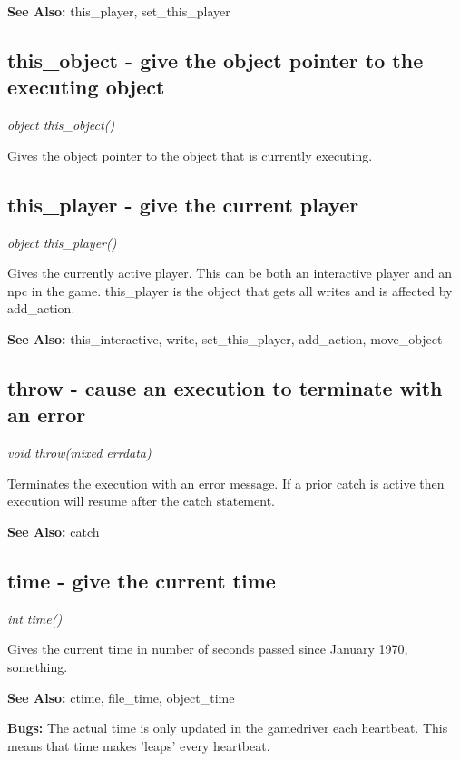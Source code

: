     {\bf See Also: }    this\_player, set\_this\_player



\subsection{this\_object - give the object pointer to the executing object}

    {\em object this\_object()}

    Gives the object pointer to the object that is currently executing.


\subsection{this\_player - give the current player}

    {\em object this\_player()}

    Gives the currently active player. This can be both an interactive
    player and an npc in the game. this\_player is the object that gets
    all writes and is affected by add\_action.

    {\bf See Also: }    this\_interactive, write, set\_this\_player, add\_action, move\_object



\subsection{throw - cause an execution to terminate with an error}

    {\em void throw(mixed errdata)}

    Terminates the execution with an error message. If a prior catch is
    active then execution will resume after the catch statement.

    {\bf See Also: }    catch



\subsection{time - give the current time}

    {\em int time()}

    Gives the current time in number of seconds passed since January 1970,
    something. 

    {\bf See Also: }    ctime, file\_time, object\_time

    {\bf Bugs: }    The actual time is only updated in the gamedriver each heartbeat.
    This means that time makes 'leaps' every heartbeat.



